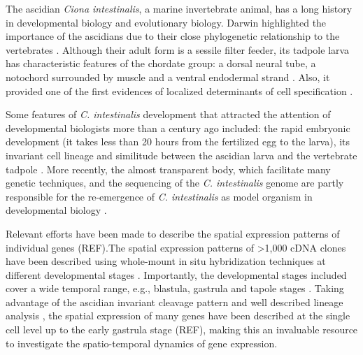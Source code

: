 
	The ascidian \textit{Ciona intestinalis}, a marine invertebrate animal, has a long history in developmental biology and evolutionary biology. 
	Darwin highlighted the importance of the ascidians due to their close phylogenetic relationship to the vertebrates \citep{Darwin20009}. Although their adult form is a sessile filter feeder, its tadpole larva has characteristic features of the chordate group: a dorsal neural tube, a notochord surrounded by muscle and a ventral endodermal strand \cite{Satoh2003}. Also, it provided one of the first evidences of localized determinants of cell specification \citep{Conklin1905}.
	
	Some features of \textit{C. intestinalis} development that attracted the attention of developmental biologists more than a century ago included: the rapid embryonic development (it takes less than 20 hours from the fertilized egg to the larva), its invariant cell lineage and similitude between the ascidian larva and the vertebrate tadpole \citep{kowalewski1866entwicklungsgeschichte,chabry1887contribution}.
	More recently, the almost transparent body, which facilitate many genetic techniques, and the sequencing of the \textit{C. intestinalis} genome \citep{Dehal2002} are partly responsible for the re-emergence of \textit{C. intestinalis} as model organism in developmental biology \citep{Levin2012}.
	
Relevant efforts have been made to describe the spatial expression patterns of individual genes (REF).The spatial expression patterns of  >1,000 cDNA clones have been described using whole-mount in situ hybridization techniques at different developmental stages \citep{Imai2004}. Importantly, the developmental stages included cover a wide temporal range, e.g., blastula, gastrula and tapole stages \citep{Satou2005}.
	 Taking advantage of the ascidian invariant cleavage pattern and well described lineage analysis \citep{Conklin1905,Nishida1987}, the spatial expression of many genes have been described at the single cell level up to the early gastrula stage (REF), making this an invaluable resource to investigate the spatio-temporal dynamics of gene expression.




